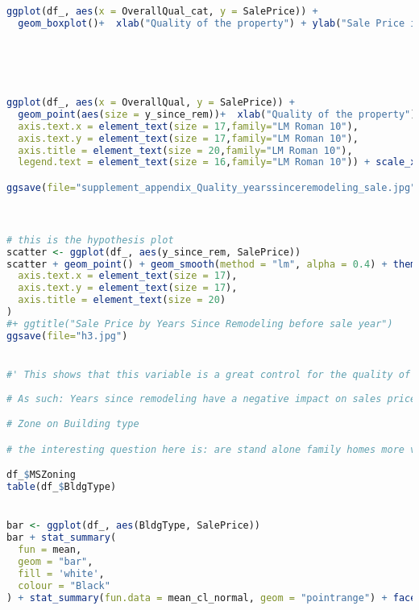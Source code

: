 \documentclass[a4paper]{article}
\begin{document}
\begin{lstlisting}[language=R]
ggplot(df_, aes(x = OverallQual_cat, y = SalePrice)) +
  geom_boxplot()+  xlab("Quality of the property") + ylab("Sale Price in 1000s") + labs(size = "Years Since Remodeling")





ggplot(df_, aes(x = OverallQual, y = SalePrice)) +
  geom_point(aes(size = y_since_rem))+  xlab("Quality of the property") + ylab("Sale Price in 1000s") + theme_set(theme_bw()+ theme(legend.position = "bottom")) + labs(size = "Years Since Remodeling",family="LM Roman 10")  + theme(text=element_text(family="LM Roman 10"),
  axis.text.x = element_text(size = 17,family="LM Roman 10"),
  axis.text.y = element_text(size = 17,family="LM Roman 10"),
  axis.title = element_text(size = 20,family="LM Roman 10"),
  legend.text = element_text(size = 16,family="LM Roman 10")) + scale_x_continuous(breaks = scales::pretty_breaks())

ggsave(file="supplement_appendix_Quality_yearssinceremodeling_sale.jpg")



# this is the hypothesis plot 
scatter <- ggplot(df_, aes(y_since_rem, SalePrice))
scatter + geom_point() + geom_smooth(method = "lm", alpha = 0.4) + theme_set(theme_bw()+ theme(legend.position = "bottom")) + labs(x = 'Time Since last Remodeling at point of sale', y = "Sale Price in 1000s",fill = "Years Since Remodeling")  + theme(text=element_text(family="LM Roman 10"),
  axis.text.x = element_text(size = 17),
  axis.text.y = element_text(size = 17),
  axis.title = element_text(size = 20)
)     
#+ ggtitle("Sale Price by Years Since Remodeling before sale year")
ggsave(file="h3.jpg")


#' This shows that this variable is a great control for the quality of the house and its condition 
 
# As such: Years since remodeling have a negative impact on sales price 

# Zone on Building type

# the interesting question here is: are stand alone family homes more valuable? than multi-unit homes 

df_$MSZoning
table(df_$BldgType)


bar <- ggplot(df_, aes(BldgType, SalePrice))
bar + stat_summary(
  fun = mean,
  geom = "bar",
  fill = 'white',
  colour = "Black"
) + stat_summary(fun.data = mean_cl_normal, geom = "pointrange") + facet_wrap(~ MSZoning) + labs(x = 'BldgType', y = 'Sale Price') 











\end{lstlisting}
\end{document}
